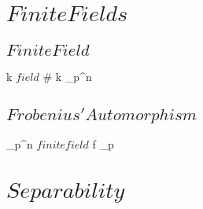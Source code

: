 \documentclass[a5paper]{book}
\begin{document}
\section{ $ Finite Fields $ }
{

	\subsection{ $ Finite Field $ }

	{
		k $ field $
	}
	{
		\# k \in \N
	}
	\denote
	{
		 \as \F_{p^n}
	}



	\subsection{ $ Frobenius' Automorphism $ }

	{
		\F_{p^n} $ finite field $
	}
	{
	}
	\denote
	{
		f \as \phin_p
	}

	\newpage

}



\section{ $ Separability $ }
{
	
	

	

	
	
}
\end{document}
